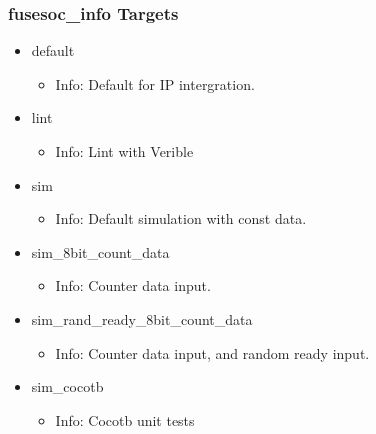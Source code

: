 \subsubsection{fusesoc\_info Targets}
\begin{itemize}
\item default
	\begin{itemize}
	\item[$\space$] Info: Default for IP intergration.
	\end{itemize}
\item lint
	\begin{itemize}
	\item[$\space$] Info: Lint with Verible
	\end{itemize}
\item sim
	\begin{itemize}
	\item[$\space$] Info: Default simulation with const data.
	\end{itemize}
\item sim\_8bit\_count\_data
	\begin{itemize}
	\item[$\space$] Info: Counter data input.
	\end{itemize}
\item sim\_rand\_ready\_8bit\_count\_data
	\begin{itemize}
	\item[$\space$] Info: Counter data input, and random ready input.
	\end{itemize}
\item sim\_cocotb
	\begin{itemize}
	\item[$\space$] Info: Cocotb unit tests
	\end{itemize}
\end{itemize}
